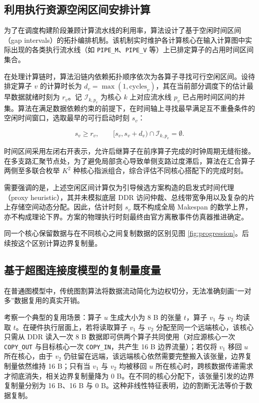 \documentclass[anonymous,notoc]{gmcm2026}
\begin{document}
\subsection{利用执行资源空闲区间安排计算}

为了在调度构建阶段兼顾计算流水线的利用率，算法设计了基于空闲时间区间（gap intervals）的拓扑编排机制。该机制实时维护各计算核心在输入计算图中实际出现的各类执行流水线（如 \texttt{PIPE\_M}、\texttt{PIPE\_V} 等）上已排定算子的占用时间区间集合。

在处理计算链时，算法沿链内依赖拓扑顺序依次为各算子寻找可行空闲区间。设待排定算子 \(v\) 的计算时长为 \(d_v = \max(1, \text{cycles}_v)\)，其在当前部分调度下的估计最早数据就绪时刻为 \(r_v\)。记 \(\mathcal{I}_{k, p_v}\) 为核心 \(k\) 上对应流水线 \(p_v\) 已占用时间区间的并集。算法在满足数据依赖约束的前提下，在时间轴上寻找最早满足互不重叠条件的空闲时间窗口，选取最早的可行启动时刻 \(s_v\)：

\begin{equation}
s_v \ge r_v, \qquad [s_v, s_v + d_v) \cap \mathcal{I}_{k, p_v} = \emptyset.
\end{equation}

时间区间采用左闭右开表示，允许后继算子在前序算子完成的时钟周期无缝衔接。在多支路汇聚节点处，为了避免局部贪心导致单侧支路过度滞后，算法在汇合算子两侧至多联合枚举 \(K^2\) 种核心指派组合，综合评估不同核心搭配下的完成时刻。

需要强调的是，上述空闲区间计算仅为引导候选方案构造的启发式时间代理（proxy heuristic），其并未模拟底层 DDR 访问仲裁、总线带宽争用以及复杂的片上存储空间动态分配。因此，估计时刻 \(s_v\) 既不构成全局 Makespan 的数学上界，亦不构成理论下界。方案的物理执行时刻最终由官方离散事件仿真器推进确定。

同一个核心保留数据与在不同核心之间复制数据的区别见图 \ref{fig:progression}。后续按这个区别计算边界复制量。

\subsection{基于超图连接度模型的复制量度量}

在普通图模型中，传统图割算法将数据流动简化为边权切分，无法准确刻画``一对多''数据复用的真实开销。

考察一个典型的复用场景：算子 \(u\) 生成大小为 8 B 的张量 \(t\)，算子 \(v_1\) 与 \(v_2\) 均读取 \(t\)。在硬件执行层面上，若将读取算子 \(v_1\) 与 \(v_2\) 分配至同一个远端核心，该核心只需从 DDR 读入一次 8 B 数据即可供两个算子共同使用（对应源核心一次 \texttt{COPY\_OUT} 与目标核心一次 \texttt{COPY\_IN}，共产生 16 B 边界流量）；若仅将 \(v_1\) 移回 \(u\) 所在核心，由于 \(v_2\) 仍驻留在远端，该远端核心依然需要完整搬入该张量，边界复制量依然维持 16 B；只有当 \(v_1\) 与 \(v_2\) 均被移回 \(u\) 所在核心时，跨核数据传递需求才彻底消失，相关边界复制量降为 0 B。在不同的核心分配下，该张量引发的边界复制量分别为 16 B、16 B 与 0 B。这种非线性特征表明，边的割断无法等价于数据复制。
\end{document}
